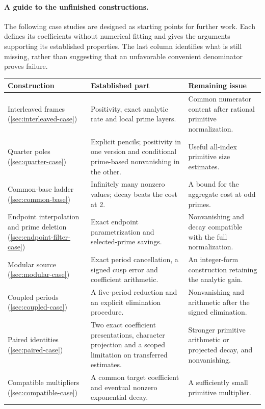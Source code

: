 \paragraph{A guide to the unfinished constructions.}
The following case studies are designed as starting points for further
work. Each defines its coefficients without numerical fitting and gives
the arguments supporting its established properties. The last column
identifies what is still missing, rather than suggesting that an
unfavorable convenient denominator proves failure.
\begin{longtable}{@{}>{\raggedright\arraybackslash}p{.24\linewidth}
                       >{\raggedright\arraybackslash}p{.32\linewidth}
                       >{\raggedright\arraybackslash}p{.36\linewidth}@{}}
\toprule
Construction & Established part & Remaining issue\\\midrule
\endhead
Interleaved frames (\ref{sec:interleaved-case})
 & Positivity, exact analytic rate and local prime layers.
 & Common numerator content after rational primitive normalization.\\[4pt]
Quarter poles (\ref{sec:quarter-case})
 & Explicit pencils; positivity in one version and conditional prime-based
   nonvanishing in the other.
 & Useful all-index primitive size estimates.\\[4pt]
Common-base ladder (\ref{sec:common-base})
 & Infinitely many nonzero values; decay beats the cost at 2.
 & A bound for the aggregate cost at odd primes.\\[4pt]
Endpoint interpolation and prime deletion (\ref{sec:endpoint-filter-case})
 & Exact endpoint parametrization and selected-prime savings.
 & Nonvanishing and decay compatible with the full normalization.\\[4pt]
Modular source (\ref{sec:modular-case})
 & Exact period cancellation, a signed cusp error and coefficient arithmetic.
 & An integer-form construction retaining the analytic gain.\\[4pt]
Coupled periods (\ref{sec:coupled-case})
 & A five-period reduction and an explicit elimination procedure.
 & Nonvanishing and arithmetic after the signed elimination.\\[4pt]
Paired identities (\ref{sec:paired-case})
 & Two exact coefficient presentations, character projection and a scoped
   limitation on transferred estimates.
 & Stronger primitive arithmetic or projected decay, and nonvanishing.\\[4pt]
Compatible multipliers (\ref{sec:compatible-case})
 & A common target coefficient and eventual nonzero exponential decay.
 & A sufficiently small primitive multiplier.\\
\bottomrule
\end{longtable}
